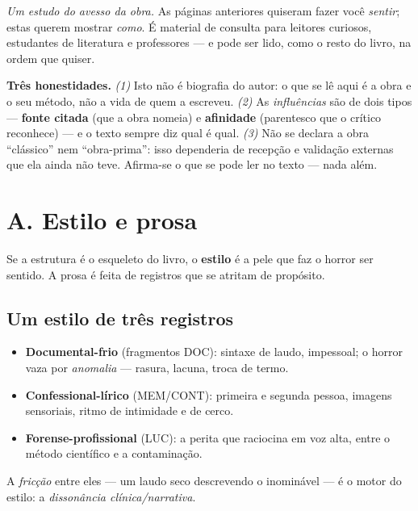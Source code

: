 \noindent\textit{Um estudo do avesso da obra.} As páginas anteriores quiseram
fazer você \emph{sentir}; estas querem mostrar \emph{como}. É material de
consulta para leitores curiosos, estudantes de literatura e professores ---
e pode ser lido, como o resto do livro, na ordem que quiser.

\vspace{0.4em}
\noindent{\small\color{aparatoacc}\rule{\linewidth}{0.6pt}}

\vspace{0.6em}
\noindent\textbf{Três honestidades.} \emph{(1)} Isto não é biografia do autor:
o que se lê aqui é a obra e o seu método, não a vida de quem a escreveu.
\emph{(2)} As \emph{influências} são de dois tipos --- \textbf{fonte citada}
(que a obra nomeia) e \textbf{afinidade} (parentesco que o crítico
reconhece) --- e o texto sempre diz qual é qual. \emph{(3)} Não se declara a
obra ``clássico'' nem ``obra-prima'': isso dependeria de recepção e validação
externas que ela ainda não teve. Afirma-se o que se pode ler no texto --- nada
além.

\section*{A. Estilo e prosa}

Se a estrutura é o esqueleto do livro, o \textbf{estilo} é a pele que faz o
horror ser sentido. A prosa é feita de registros que se atritam de propósito.

\subsection*{Um estilo de três registros}
\begin{itemize}
\item \textbf{Documental-frio} (fragmentos DOC): sintaxe de laudo, impessoal;
o horror vaza por \emph{anomalia} --- rasura, lacuna, troca de termo.
\item \textbf{Confessional-lírico} (MEM/CONT): primeira e segunda pessoa,
imagens sensoriais, ritmo de intimidade e de cerco.
\item \textbf{Forense-profissional} (LUC): a perita que raciocina em voz alta,
entre o método científico e a contaminação.
\end{itemize}
\noindent A \emph{fricção} entre eles --- um laudo seco descrevendo o
inominável --- é o motor do estilo: a \emph{dissonância clínica\slash narrativa}.

